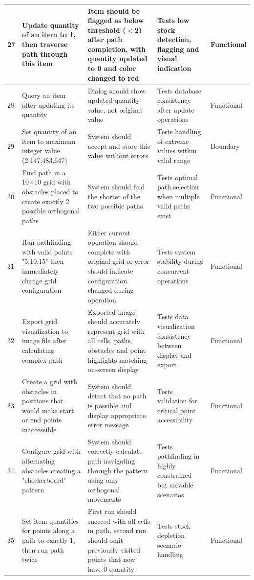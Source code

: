 \begin{longtable}{|p{}|p{}|p{}|p{}|p{}|}
\hline
27 & Update quantity of an item to 1, then traverse path through this item & Item should be flagged as below threshold ($<$2) after path completion, with quantity updated to 0 and color changed to red & Tests low stock detection, flagging and visual indication & Functional \\
\hline
28 & Query an item after updating its quantity & Dialog should show updated quantity value, not original value & Tests database consistency after update operations & Functional \\
\hline
29 & Set quantity of an item to maximum integer value (2,147,483,647) & System should accept and store this value without errors & Tests handling of extreme values within valid range & Boundary \\
\hline
30 & Find path in a 10×10 grid with obstacles placed to create exactly 2 possible orthogonal paths & System should find the shorter of the two possible paths & Tests optimal path selection when multiple valid paths exist & Functional \\
\hline
31 & Run pathfinding with valid points "5,10,15" then immediately change grid configuration & Either current operation should complete with original grid or error should indicate configuration changed during operation & Tests system stability during concurrent operations & Functional \\
\hline
32 & Export grid visualization to image file after calculating complex path & Exported image should accurately represent grid with all cells, paths, obstacles and point highlights matching on-screen display & Tests data visualization consistency between display and export & Functional \\
\hline
33 & Create a grid with obstacles in positions that would make start or end points inaccessible & System should detect that no path is possible and display appropriate error message & Tests validation for critical point accessibility & Functional \\
\hline
34 & Configure grid with alternating obstacles creating a "checkerboard" pattern & System should correctly calculate path navigating through the pattern using only orthogonal movements & Tests pathfinding in highly constrained but solvable scenarios & Functional \\
\hline
35 & Set item quantities for points along a path to exactly 1, then run path twice & First run should succeed with all cells in path, second run should omit previously visited points that now have 0 quantity & Tests stock depletion scenario handling & Functional \\

\end{longtable}
